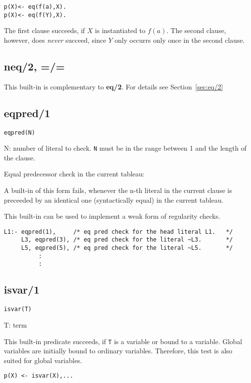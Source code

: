 \begin{verbatim}
p(X)<- eq(f(a),X).
p(X)<- eq(f(Y),X).
\end{verbatim}
The first clause succeeds, if $X$ is instantiated to $f(a)$.
The second clause, however, does {\em never\/} succeed, since
$Y$ only occurrs only once in the second clause.

\subsection{neq/2, =/=}

This built-in is complementary to {\bf eq/2}. For details see
Section~\ref{sec:eq/2}


\subsection{eqpred/1}

{\tt eqpred(N)}

N: number of literal to check. {\tt N} must be in the range
	between 1 and the length of the clause.


Equal predecessor check in the current tableau:

A built-in of this form fails, whenever the 
            n-th literal in the current clause is preceeded by an 
            identical one (syntactically equal) in the current tableau. 

This built-in can be used to implement a weak form of
regularity checks.

\begin{verbatim}
L1:- eqpred(1),     /* eq pred check for the head literal L1.   */
     L3, eqpred(3), /* eq pred check for the literal ~L3.       */
     L5, eqpred(5), /* eq pred check for the literal ~L5.       */
	      :
	      :
\end{verbatim}

\subsection{isvar/1}

{\tt isvar(T)}

T: term


This built-in predicate succeeds, if {\tt T} is
a variable or bound to a variable. 
Global variables are initially bound to ordinary variables.
Therefore, this test is also suited for global variables.
\begin{verbatim}
p(X) <- isvar(X),...
\end{verbatim}

